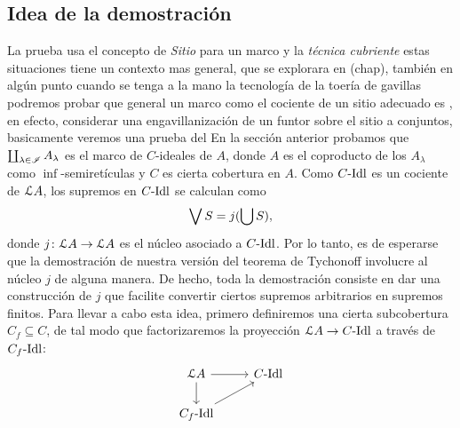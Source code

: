 \subsection{Idea de la demostración}
La prueba usa el concepto de \emph{Sitio} para un marco y la \emph{técnica cubriente} estas situaciones tiene un contexto mas general, que se explorara en (chap), también en algún punto cuando se tenga a la mano la tecnología de la toería de gavillas podremos probar que general un marco como el cociente de un sitio adecuado es , en efecto, considerar una engavillanización de un funtor sobre el sitio a conjuntos, basicamente veremos una prueba del \cite[Lemma V.1.7]{johnstone1986stone} 
En la sección anterior probamos que
$\coprod_{\lambda\in\scr I}A_\lambda$
es el marco de $C$-ideales de $A$, donde $A$ es el coproducto
de los $A_\lambda$ como $\inf$-semiretículas y $C$ es cierta
cobertura en $A$.
Como $C\Idl$ es un cociente de $\cal LA$,
los supremos en $C\Idl$ se calculan como
\[
    \Sup S = j(\bigcup S)
,\]
donde $j\colon\cal LA\to\cal LA$ es el núcleo asociado a $C\Idl$.
Por lo tanto, es de esperarse que la demostración de
nuestra versión del teorema de Tychonoff involucre al núcleo
$j$ de alguna manera.
De hecho, toda la demostración consiste
en dar una construcción de $j$ que facilite convertir
ciertos supremos arbitrarios en supremos finitos.
Para llevar a cabo esta idea, primero definiremos una
cierta subcobertura $C_f\subseteq C$, de tal modo que
factorizaremos la proyección $\cal LA\to C\Idl$ a través de
$C_f\Idl$:
\[
    \begin{tikzcd}
        \cal LA \ar[d] \ar[r] & C\Idl \\
        C_f\Idl \ar[ur]
    \end{tikzcd}
\]

